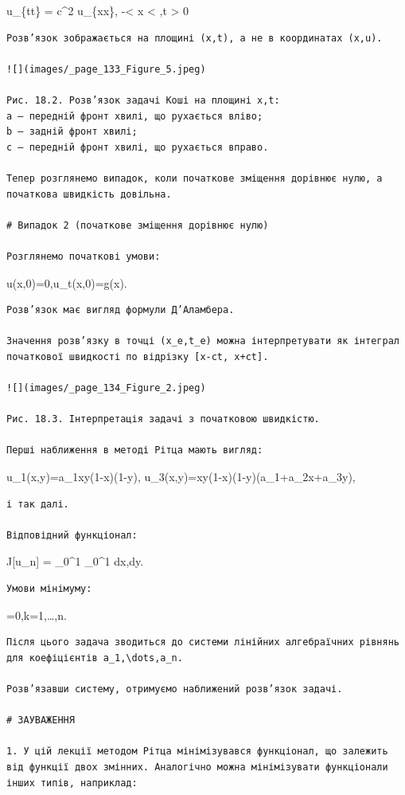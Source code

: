 \documentclass[
  ukrainian,
]{article}
\begin{document}
u\_\{tt\} = c\^{}2 u\_\{xx\}, \quad -\infty \textless{} x \textless{}
\infty,\quad t \textgreater{} 0

\begin{verbatim}
Розв’язок зображається на площині (x,t), а не в координатах (x,u).

![](images/_page_133_Figure_5.jpeg)

Рис. 18.2. Розв’язок задачі Коші на площині x,t:  
a — передній фронт хвилі, що рухається вліво;  
b — задній фронт хвилі;  
c — передній фронт хвилі, що рухається вправо.

Тепер розглянемо випадок, коли початкове зміщення дорівнює нулю, а початкова швидкість довільна.

# Випадок 2 (початкове зміщення дорівнює нулю)

Розглянемо початкові умови:
\end{verbatim}

u(x,0)=0,\quad u\_t(x,0)=g(x).

\begin{verbatim}
Розв’язок має вигляд формули Д’Аламбера.

Значення розв’язку в точці (x_e,t_e) можна інтерпретувати як інтеграл початкової швидкості по відрізку [x-ct, x+ct].

![](images/_page_134_Figure_2.jpeg)

Рис. 18.3. Інтерпретація задачі з початковою швидкістю.

Перші наближення в методі Рітца мають вигляд:
\end{verbatim}

u\_1(x,y)=a\_1xy(1-x)(1-y), u\_3(x,y)=xy(1-x)(1-y)(a\_1+a\_2x+a\_3y),

\begin{verbatim}
і так далі.

Відповідний функціонал:
\end{verbatim}

J{[}u\_n{]} = \int\_0\^{}1 \int\_0\^{}1
\left[\left(\sum_{j=1}^n a_j \frac{\partial \varphi_j}{\partial x}\right)^2 + \left(\sum_{j=1}^n a_j \frac{\partial \varphi_j}{\partial y}\right)^2 + 2f \sum_{j=1}^n a_j \varphi_j\right] dx,dy.

\begin{verbatim}
Умови мінімуму:
\end{verbatim}

=0,\quad k=1,\dots,n.

\begin{verbatim}
Після цього задача зводиться до системи лінійних алгебраїчних рівнянь для коефіцієнтів a_1,\dots,a_n.

Розв’язавши систему, отримуємо наближений розв’язок задачі.

# ЗАУВАЖЕННЯ

1. У цій лекції методом Рітца мінімізувався функціонал, що залежить від функції двох змінних. Аналогічно можна мінімізувати функціонали інших типів, наприклад:
\end{verbatim}
\end{document}
